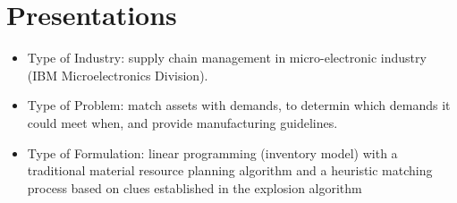 \documentclass[10pt, twocolumn]{article}
\begin{document}
\section*{Presentations}
\begin{itemize}
\item Type of Industry: supply chain management in micro-electronic industry (IBM Microelectronics Division). 
\item Type of Problem: match assets with demands, to determin which demands it could meet when, and provide manufacturing guidelines.
\item Type of Formulation: linear programming (inventory model) with a traditional material resource planning algorithm and a heuristic matching process based on clues established in the explosion algorithm
\end{itemize}
\end{document}
